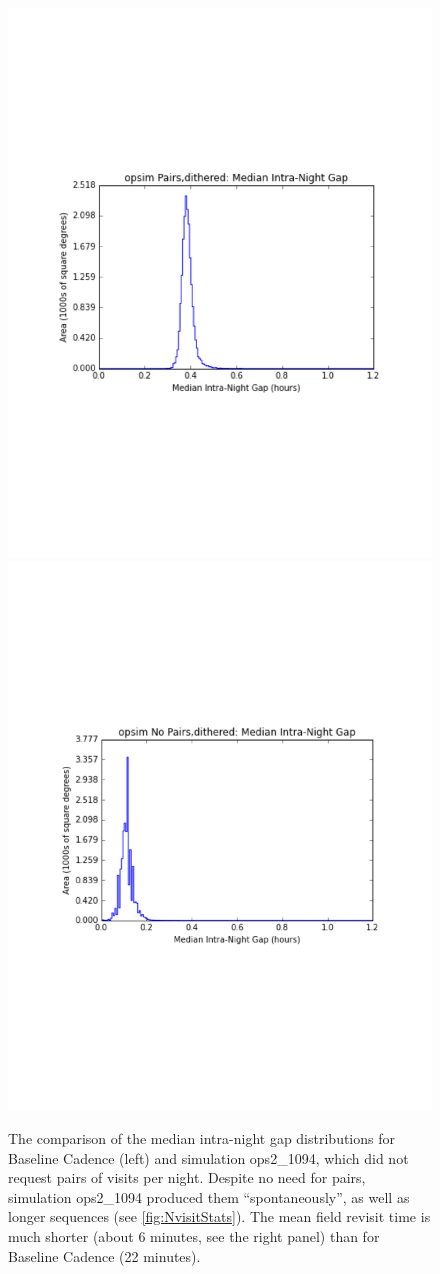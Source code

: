 \begin{figure}[t!]
\vskip -1.2in
\includegraphics[angle=0,width=0.49\hsize:,clip]{figs/medinternight1.pdf}
\includegraphics[angle=0,width=0.49\hsize:,clip]{figs/medinternight2.pdf}
\vskip -1.3in
\caption{
The comparison of the median intra-night gap distributions for Baseline Cadence (left)
and simulation ops2\_1094, which did not request pairs of visits per night.
Despite no need for pairs, simulation ops2\_1094 produced them ``spontaneously'',
as well as longer sequences (see \autoref{fig:NvisitStats}). The mean field revisit
time is much shorter (about 6 minutes, see the right panel) than for Baseline Cadence
(22 minutes).}
\label{fig:intranightgapCompare}
\end{figure}



